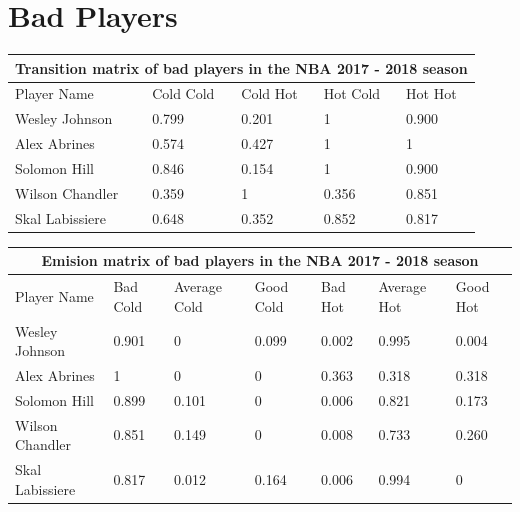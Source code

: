 \documentclass[12pt, authoryear]{elsarticle}
\begin{document}
\section{Bad Players} \label{bad_players}
\begin{tabular}{ |p{3cm}||p{2cm}|p{2cm}|p{2cm}|p{2cm}|  }
	\hline
	\multicolumn{5}{|c|}{Transition matrix of bad players in the NBA 2017 - 2018 season} \\
	\hline
	Player Name & Cold Cold & Cold Hot &Hot Cold & Hot Hot\\
	\hline
	Wesley Johnson&   0.799 &	0.201 &	1 &	0.900\\
	Alex Abrines&   0.574&	0.427&	1&	1\\
	Solomon Hill &0.846&	0.154&	1&	0.900\\
	Wilson Chandler&   0.359&	1&	0.356&	0.851\\
	Skal Labissiere& 0.648&	0.352&	0.852&	0.817\\
	\hline
\end{tabular}

\noindent\begin{tabular}{ |p{3cm}||p{1.5cm}|p{1.5cm}|p{1.5cm}|p{1.5cm}|p{1.5cm}|p{1.5cm}|  }
	\hline
	\multicolumn{7}{|c|}{Emision matrix of bad players in the NBA 2017 - 2018 season} \\
	\hline
	Player Name &Bad Cold& Average Cold&	Good Cold&	Bad Hot&	Average Hot&	Good Hot\\
	\hline
	Wesley Johnson&  0.901&	0&	 0.099&	0.002&	0.995&	0.004\\
	Alex Abrines&    1&	    0&    	0&  0.363&	0.318&	0.318\\
	Solomon Hill&    0.899&	0.101&	0&  0.006&	0.821&	0.173\\
	Wilson Chandler& 0.851& 0.149&	0&	0.008&	0.733&	0.260\\
	Skal Labissiere& 0.817&	0.012&	0.164&0.006&0.994&	0\\
	\hline
\end{tabular}
\end{document}
